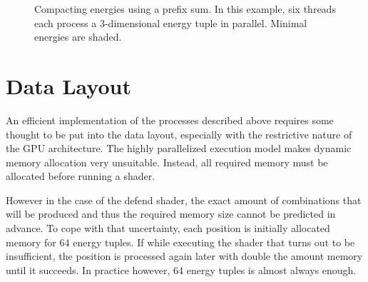 \begin{figure}[htpb]
\caption{Compacting energies using a prefix sum.
    In this example, six threads each process a 3-dimensional energy tuple in parallel.
    Minimal energies are shaded.}%
\label{fig:compacting}
\end{figure}


\section{Data Layout}\label{sec:data}

An efficient implementation of the processes described above requires some
thought to be put into the data layout,
especially with the restrictive nature of the GPU architecture.
The highly parallelized execution model makes dynamic memory allocation very
unsuitable.
Instead, all required memory must be allocated before running a shader.

However in the case of the defend shader,
the exact amount of combinations that will be produced
and thus the required memory size cannot be predicted in advance.
To cope with that uncertainty,
each position is initially allocated memory for 64 energy tuples.
If while executing the shader that turns out to be insufficient,
the position is processed again later with double the amount memory until it
succeeds.
In practice however, 64 energy tuples is almost always enough.

